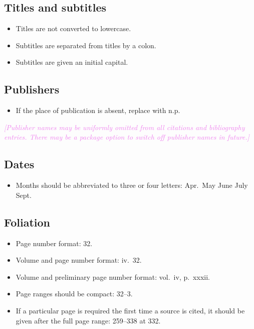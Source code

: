 \documentclass[extrafontsizes,11pt,a4paper,oneside]{memoir}
\newcommand*{\aside}[1]{\textcolor{violet}{\emph{[#1]}}}
\begin{document}
\subsection{Titles and subtitles}

\begin{itemize}
  \item Titles are not converted to lowercase.
  
  \item Subtitles are separated from titles by a colon.
  
  \item Subtitles are given an initial capital.
  \par{}
\end{itemize}

\subsection{Publishers}

\begin{itemize}
  \item If the place of publication is absent, replace with n.p.
\end{itemize}

\aside{Publisher names may be uniformly omitted from all citations and bibliography entries. There may be a package option to switch off publisher names in future.}

\subsection{Dates}

\begin{itemize}
  \item Months should be abbreviated to three or four letters: Apr.\ May June July Sept. %
\end{itemize}

\subsection{Foliation}

\begin{itemize}
  \item Page number format: 32.
  \item Volume and page number format: iv.\ 32.
  \item Volume and preliminary page number format: vol.\ iv, p.\ xxxii.
  \item Page ranges should be compact: 32--3.\\
  \item If a particular page is required the first time a source is cited, it should be given after the full page range: 259--338 at 332.\\
\end{itemize}
\end{document}
